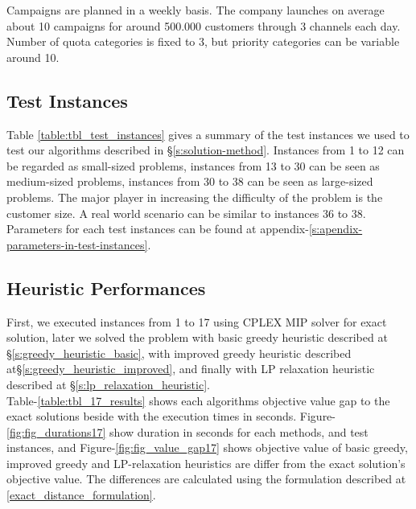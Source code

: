 \documentclass[11pt]{article}
\begin{document}
Campaigns are planned in a weekly basis. The company launches on average about 10 campaigns for around 500.000 customers through 3 channels each day. Number of quota categories is fixed to 3, but priority categories can be variable around 10.

\subsection{Test Instances} \label{test_cases}
Table \ref{table:tbl_test_instances} gives a summary of the test instances we used to test our algorithms described in \S \ref{s:solution-method}. Instances from 1 to 12 can be regarded as small-sized problems, instances from 13 to 30 can be seen as medium-sized problems, instances from 30 to 38 can be seen as large-sized problems. The major player in increasing the difficulty of the problem is the customer size. A real world scenario can be similar to instances 36 to 38. Parameters for each test instances can be found at appendix-\ref{s:apendix-parameters-in-test-instances}.\\

\begin{table}[htb!]
\end{table}
\clearpage

\subsection{Heuristic Performances} \label{s:test_evaluation}
First, we executed instances from 1 to 17 using CPLEX MIP solver for exact solution, later we solved the problem with basic greedy heuristic described at \S \ref{s:greedy_heuristic_basic}, with improved greedy heuristic described at\S \ref{s:greedy_heuristic_improved}, and finally with LP relaxation heuristic described at \S \ref{s:lp_relaxation_heuristic}.\\

Table-\ref{table:tbl_17_results} shows each algorithms objective value gap to the exact solutions beside with the execution times in seconds. Figure-\ref{fig:fig_durations17} show duration in seconds for each methods, and test instances, and Figure-\ref{fig:fig_value_gap17} shows objective value of basic greedy, improved greedy and LP-relaxation heuristics are differ from the exact solution's objective value. The differences are calculated using the formulation described at \equationautorefname \eqref{exact_distance_formulation}.\\
\end{document}

